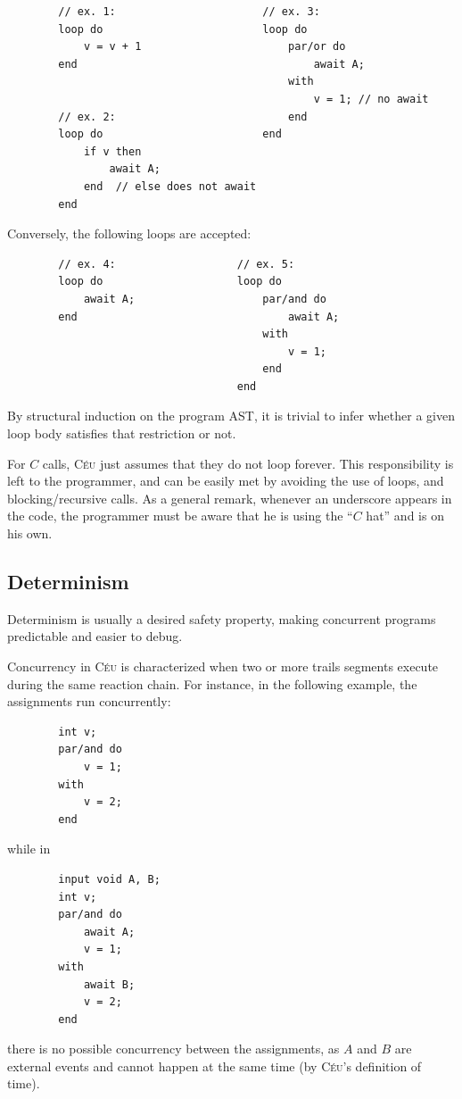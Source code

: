 \documentclass[11pt,a4paper]{article}
\newcommand{\2}{\;\;}
\newcommand{\5}{\;\;\;\;\;}
\newcommand{\CEU}{\textsc{C\'{e}u}}
\begin{document}
{\small
\begin{verbatim}
        // ex. 1:                       // ex. 3:
        loop do                         loop do
            v = v + 1                       par/or do
        end                                     await A;
                                            with
                                                v = 1; // no await
        // ex. 2:                           end
        loop do                         end
            if v then
                await A;
            end  // else does not await
        end
\end{verbatim}
}
Conversely, the following loops are accepted:
{\small
\begin{verbatim}
        // ex. 4:                   // ex. 5:
        loop do                     loop do
            await A;                    par/and do
        end                                 await A;
                                        with
                                            v = 1;
                                        end
                                    end
\end{verbatim}
}

By structural induction on the program AST, it is trivial to infer whether a 
given loop body satisfies that restriction or not.

For $C$ calls, \CEU{} just assumes that they do not loop forever.
This responsibility is left to the programmer, and can be easily met by 
avoiding the use of loops, and blocking/recursive calls.
As a general remark, whenever an underscore appears in the code, the programmer 
must be aware that he is using the ``$C$ hat'' and is on his own.

\subsection{Determinism}
\label{sec:ceu:det}

Determinism is usually a desired safety property, making concurrent programs 
predictable and easier to debug.

Concurrency in \CEU{} is characterized when two or more trails segments execute 
during the same reaction chain.
For instance, in the following example, the assignments run concurrently:
{\small
\begin{verbatim}
        int v;
        par/and do
            v = 1;
        with
            v = 2;
        end
\end{verbatim}
}
while in
{\small
\begin{verbatim}
        input void A, B;
        int v;
        par/and do
            await A;
            v = 1;
        with
            await B;
            v = 2;
        end
\end{verbatim}
}
there is no possible concurrency between the assignments, as $A$ and $B$ are 
external events and cannot happen at the same time (by \CEU's definition of 
time).
\end{document}
